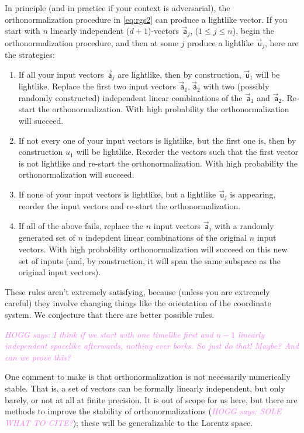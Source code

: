 \documentclass{article}
\newcommand\upvec[1]{\!\vec{\,\mathrm{#1}}}
\newcommand{\Lvec}[1]{\upvec{\mathsf{#1}}} %
\newcommand{\plus}{\!+\!} %
\newcommand{\HOGG}[1]{\textcolor{violet}{\textsl{HOGG says: {#1}}}}
\begin{document}
In principle (and in practice if your context is adversarial), the orthonormalization procedure in \eqref{eq:rgs2} can produce a lightlike vector.
If you start with $n$ linearly independent ($d\plus1$)-vectors $\Lvec{a}_j$, ($1\leq j\leq n$), begin the orthonormalization procedure, and then at some $j$ produce a lightlike $\Lvec{u}_j$, here are the strategies:
\begin{enumerate}
\item If all your input vectors $\Lvec{a}_j$ are lightlike, then by construction, $\Lvec{u}_1$ will be lightlike.
    Replace the first two input vectors $\Lvec{a}_1,\Lvec{a}_2$ with two (possibly randomly constructed) independent linear combinations of the $\Lvec{a}_1$ and $\Lvec{a}_2$.
    Re-start the orthonormalization.
    With high probability the orthonormalization will succeed.
    \item If not every one of your input vectors is lightlike, but the first one is, then by construction ${u}_1$ will be lightlike.
    Reorder the vectors such that the first vector is not lightlike and re-start the orthonormalization.
    With high probability the orthonormalization will succeed.
    \item If none of your input vectors is lightlike, but a lightlike $\Lvec{u}_j$ is appearing, reorder the input vectors and re-start the orthonormalization.
    \item If all of the above fails, replace the $n$ input vectors $\Lvec{a}_j$ with a randomly generated set of $n$ indepdent linear combinations of the original $n$ input vectors.
    With high probability orthonormalization will succeed on this new set of inputs (and, by construction, it will span the same subspace as the original input vectors).
\end{enumerate}
These rules aren't extremely satisfying, because (unless you are extremely careful) they involve changing things like the orientation of the coordinate system.
We conjecture that there are better possible rules.

\HOGG{I think if we start with one timelike first and $n-1$ linearly independent spacelike afterwards, nothing ever borks.
So just do that! Maybe? And can we prove this?}

One comment to make is that orthonormalization is not necessarily numerically stable.
That is, a set of vectors can be formally linearly independent, but only barely, or not at all at finite precision.
It is out of scope for us here, but there are methods to improve the stability of orthonormalizations (\HOGG{SOLE WHAT TO CITE?}); these will be generalizable to the Lorentz space.
\end{document}
